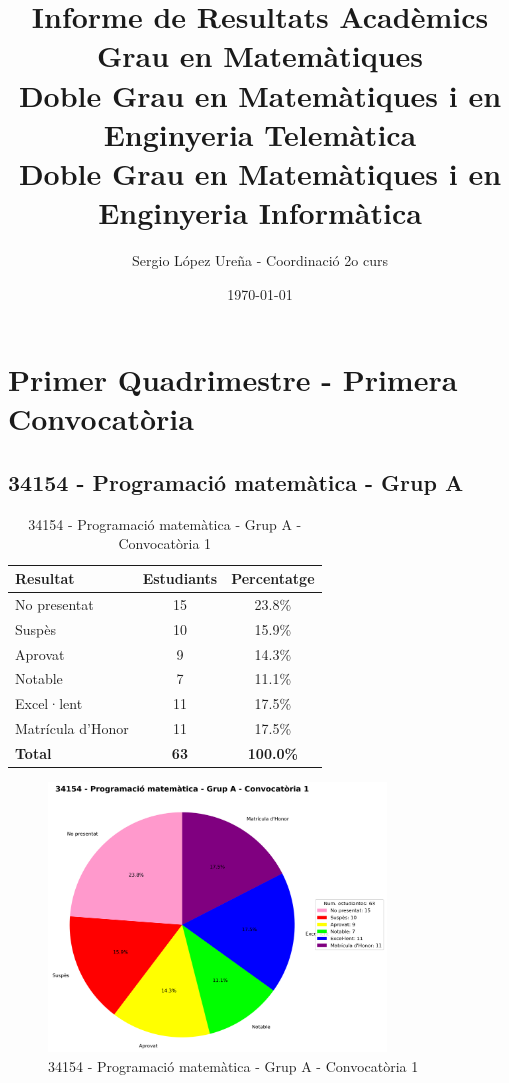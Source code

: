\documentclass[12pt,a4paper]{article}
\title{Informe de Resultats Acadèmics\\
\small Grau en Matemàtiques\\
\small Doble Grau en Matemàtiques i en Enginyeria Telemàtica\\
\small Doble Grau en Matemàtiques i en Enginyeria Informàtica}
\author{Sergio López Ureña - Coordinació 2o curs}
\date{\today}
\begin{document}
\maketitle
\tableofcontents
\newpage


\section{Primer Quadrimestre - Primera Convocatòria}


\subsection{34154 - Programació matemàtica - Grup A}


\begin{table}[H]
\centering
\caption{34154 - Programació matemàtica - Grup A - Convocatòria 1}
\begin{tabular}{|l|c|c|}
\hline
\textbf{Resultat} & \textbf{Estudiants} & \textbf{Percentatge} \\
\hline
No presentat & 15 & 23.8\% \\
Suspès & 10 & 15.9\% \\
Aprovat & 9 & 14.3\% \\
Notable & 7 & 11.1\% \\
Excel·lent & 11 & 17.5\% \\
Matrícula d'Honor & 11 & 17.5\% \\
\hline
\textbf{Total} & \textbf{63} & \textbf{100.0\%} \\
\hline
\end{tabular}
\end{table}

\begin{figure}[H]
\centering
\includegraphics[width=0.8\textwidth]{graficos/34154_A_1Q1_0.png}
\caption{34154 - Programació matemàtica - Grup A - Convocatòria 1}
\end{figure}
\end{document}
